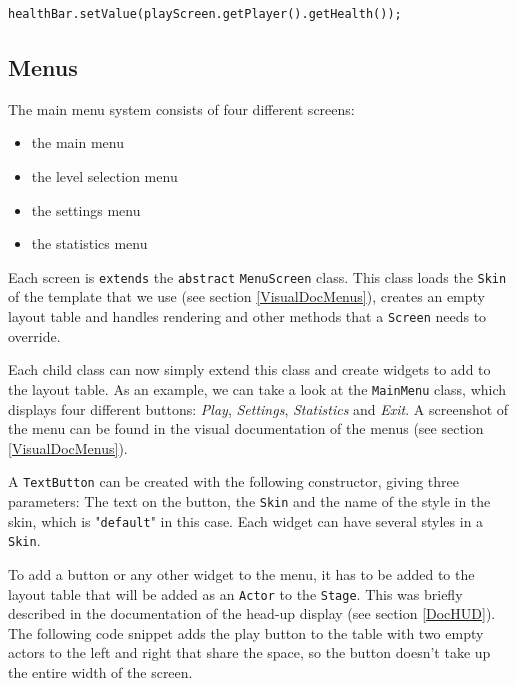 \documentclass[12p]{article}
\begin{document}
\begin{verbatim}
healthBar.setValue(playScreen.getPlayer().getHealth());
\end{verbatim}


\newpage
\subsection{Menus} \label{DocMenus}

The main menu system consists of four different screens:

\begin{itemize}
    \item the main menu
    \item the level selection menu
    \item the settings menu
    \item the statistics menu
\end{itemize}

Each screen is \texttt{extends} the \texttt{abstract} \texttt{MenuScreen} class. This class loads the \texttt{Skin} of the template that we use (see section \ref{VisualDocMenus}), creates an empty layout table and handles rendering and other methods that a \texttt{Screen} needs to override.

Each child class can now simply extend this class and create widgets to add to the layout table. As an example, we can take a look at the \texttt{MainMenu} class, which displays four different buttons: \emph{Play}, \emph{Settings}, \emph{Statistics} and \emph{Exit}. A screenshot of the menu can be found in the visual documentation of the menus (see section \ref{VisualDocMenus}).

A \texttt{TextButton} can be created with the following constructor, giving three parameters: The text on the button, the \texttt{Skin} and the name of the style in the skin, which is "\texttt{default}" in this case. Each widget can have several styles in a \texttt{Skin}.


To add a button or any other widget to the menu, it has to be added to the layout table that will be added as an \texttt{Actor} to the \texttt{Stage}. This was briefly described in the documentation of the head-up display (see section \ref{DocHUD}). The following code snippet adds the play button to the table with two empty actors to the left and right that share the space, so the button doesn't take up the entire width of the screen.
\end{document}
